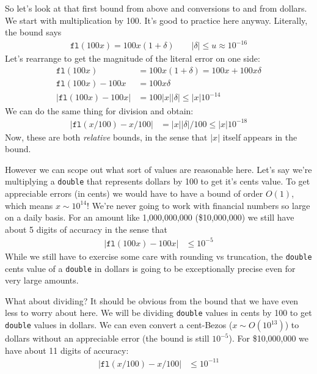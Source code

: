 \documentclass[11pt, oneside]{amsart}   	%
\begin{document}
So let's look at that first bound from above and conversions to and from dollars. We start with multiplication by 100. It's good to practice here anyway. Literally, the bound says
\begin{align*}
    \texttt{fl}(100x) = 100x ( 1 + \delta )
    \quad\quad
    |\delta| \leq u \approx 10^{-16}
\end{align*}
Let's rearrange to get the magnitude of the literal error on one side: 
\begin{align*}
    \texttt{fl}(100x) 
        &= 100x ( 1 + \delta ) = 100x + 100 x \delta \\
    \texttt{fl}(100x) - 100x 
        &= 100 x \delta \\
    | \texttt{fl}(100x) - 100x |
        &= 100 |x|| \delta | \leq |x| 10^{-14}
\end{align*}
We can do the same thing for division and obtain:
\begin{align*}
    | \texttt{fl}(x/100) - x/100 |
        &= |x|| \delta |/100 \leq |x| 10^{-18}
\end{align*}
Now, these are both {\em relative} bounds, in the sense that $|x|$ itself appears in the bound. 

However we can scope out what sort of values are reasonable here. Let's say we're multiplying a \texttt{double} that represents dollars by 100 to get it's cents value. To get appreciable errors (in cents) we would have to have a bound of order $O(1)$, which means $x \sim 10^{14}$! We're never going to work with financial numbers so large on a daily basis. For an amount like 1,000,000,000 (\$10,000,000) we still have about 5 digits of accuracy in the sense that 
\begin{align*}
    | \texttt{fl}(100x) - 100x | &\leq 10^{-5}
\end{align*}
While we still have to exercise some care with rounding vs truncation, the \texttt{double} cents value of a \texttt{double} in dollars is going to be exceptionally precise even for very large amounts. 

What about dividing? It should be obvious from the bound that we have even less to worry about here. We will be dividing \texttt{double} values in cents by 100 to get \texttt{double} values in dollars. We can even convert a cent-Bezos ($x \sim O(10^{13})$) to dollars without an appreciable error (the bound is still $10^{-5}$). For \$10,000,000 we have about 11 digits of accuracy: 
\begin{align*}
    | \texttt{fl}(x/100) - x/100 | &\leq 10^{-11}
\end{align*}
\end{document}
